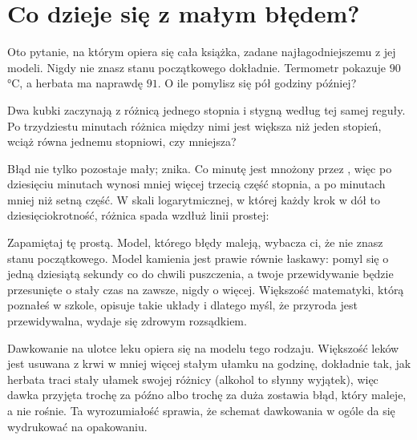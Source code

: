 \section{Co dzieje się z małym błędem?}
\label{sec:ch01-error}

\noindent
Oto pytanie, na którym opiera się cała książka, zadane najłagodniejszemu z
jej modeli. Nigdy nie znasz stanu początkowego dokładnie. Termometr pokazuje
$90$\,°C, a herbata ma naprawdę $91$. O ile pomylisz się pół godziny później?

\begin{think}
Dwa kubki zaczynają z różnicą jednego stopnia i stygną według tej samej
reguły. Po trzydziestu minutach różnica między nimi jest większa niż jeden
stopień, wciąż równa jednemu stopniowi, czy mniejsza?
\end{think}



\noindent
Błąd nie tylko pozostaje mały; znika. Co minutę jest mnożony przez
, więc po dziesięciu minutach wynosi mniej więcej
trzecią część stopnia, a po  minutach mniej niż
setną część. W skali logarytmicznej, w której każdy krok w dół to
dziesięciokrotność, różnica spada wzdłuż linii prostej:


\noindent
Zapamiętaj tę prostą. Model, którego błędy maleją, wybacza ci, że nie znasz
stanu początkowego. Model kamienia jest prawie równie łaskawy: pomyl się o
jedną dziesiątą sekundy co do chwili puszczenia, a twoje przewidywanie
będzie przesunięte o stały czas na zawsze, nigdy o więcej. Większość
matematyki, którą poznałeś w szkole, opisuje takie układy i dlatego myśl,
że przyroda jest przewidywalna, wydaje się zdrowym rozsądkiem.

\begin{worldbox}
Dawkowanie na ulotce leku opiera się na modelu tego rodzaju. Większość leków
jest usuwana z krwi w mniej więcej stałym ułamku na godzinę, dokładnie tak,
jak herbata traci stały ułamek swojej różnicy (alkohol to słynny wyjątek),
więc dawka przyjęta trochę za późno albo trochę za duża zostawia błąd, który
maleje, a nie rośnie. Ta wyrozumiałość sprawia, że schemat dawkowania w ogóle
da się wydrukować na opakowaniu.
\end{worldbox}

